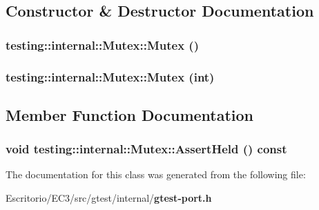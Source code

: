 \subsection{Constructor \& Destructor Documentation}
\subsubsection{\setlength{\rightskip}{0pt plus 5cm}testing::internal::Mutex::Mutex ()\hspace{0.3cm}{\tt  [inline]}}\label{classtesting_1_1internal_1_1Mutex_c98eef913c0cc92d61c814223246dc39}


\subsubsection{\setlength{\rightskip}{0pt plus 5cm}testing::internal::Mutex::Mutex (int)\hspace{0.3cm}{\tt  [inline, explicit]}}\label{classtesting_1_1internal_1_1Mutex_ef72699121099a967c94913f52a333f7}




\subsection{Member Function Documentation}
\subsubsection{\setlength{\rightskip}{0pt plus 5cm}void testing::internal::Mutex::AssertHeld () const\hspace{0.3cm}{\tt  [inline]}}\label{classtesting_1_1internal_1_1Mutex_a97ea28d27b7ca2799245fda377bd961}




The documentation for this class was generated from the following file:\begin{CompactItemize}
\item 
Escritorio/EC3/src/gtest/internal/{\bf gtest-port.h}\end{CompactItemize}
